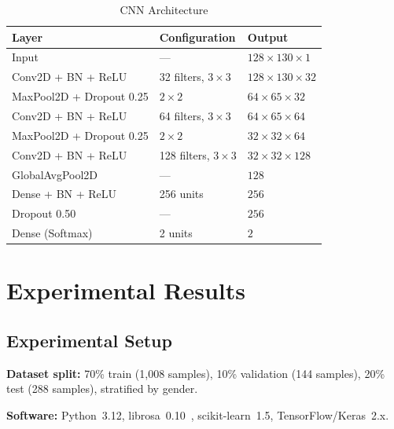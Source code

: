 \documentclass[conference]{IEEEtran}
\begin{document}
\begin{table}[!t]
  \caption{CNN Architecture}
  \label{tab:cnn}
  \centering
  \begin{tabular}{@{}lll@{}}
    \toprule
    \textbf{Layer}           & \textbf{Configuration}      & \textbf{Output} \\
    \midrule
    Input                    & ---                         & $128\!\times\!130\!\times\!1$ \\
    Conv2D + BN + ReLU       & 32 filters, $3\!\times\!3$  & $128\!\times\!130\!\times\!32$ \\
    MaxPool2D + Dropout 0.25 & $2\!\times\!2$              & $64\!\times\!65\!\times\!32$ \\
    Conv2D + BN + ReLU       & 64 filters, $3\!\times\!3$  & $64\!\times\!65\!\times\!64$ \\
    MaxPool2D + Dropout 0.25 & $2\!\times\!2$              & $32\!\times\!32\!\times\!64$ \\
    Conv2D + BN + ReLU       & 128 filters, $3\!\times\!3$ & $32\!\times\!32\!\times\!128$ \\
    GlobalAvgPool2D          & ---                         & $128$ \\
    Dense + BN + ReLU        & 256 units                   & $256$ \\
    Dropout 0.50             & ---                         & $256$ \\
    Dense (Softmax)          & 2 units                     & $2$ \\
    \bottomrule
  \end{tabular}
\end{table}

\section{Experimental Results}

\subsection{Experimental Setup}

\textbf{Dataset split:} 70\% train (1,008 samples), 10\% validation
(144 samples), 20\% test (288 samples), stratified by gender.

\textbf{Software:} Python~3.12, librosa~0.10~\cite{mcfee2015librosa},
scikit-learn~1.5, TensorFlow/Keras~2.x.
\end{document}
